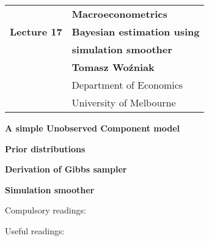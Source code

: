 \documentclass[notes,blackandwhite,mathsans,usenames,dvipsnames]{beamer}
\begin{document}







{
\begin{frame}

\vspace{1cm}
\begin{tabular}{rl}
&\textbf{\LARGE\color{lightgray}\color{mcxs2} Macroeconometrics}\\[8ex]
\textbf{\Large Lecture 17}&\textbf{\Large\color{mcxs2}Bayesian estimation using}\\
&\textbf{\Large\color{mcxs2}simulation smoother}\\[18ex]
&\textbf{Tomasz Wo\'zniak}\\[1ex]
&{\small\color{mcxs2} Department of Economics}\\
&{\small\color{mcxs2}University of Melbourne}
\end{tabular}

\end{frame}
}



{
\begin{frame}

\vspace{1cm}\textbf{\color{mcxs2}A simple Unobserved Component model}


\bigskip\textbf{\color{mcxs2}Prior distributions}

\bigskip\textbf{\color{purple}Derivation of Gibbs sampler}

\bigskip\textbf{\color{mcxs2}Simulation smoother}


\vspace{1cm} Compulsory readings: \footnotesize



\bigskip\normalsize Useful readings: \footnotesize


\end{frame}
}
\end{document}
